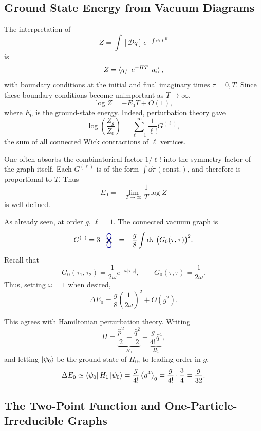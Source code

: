\subsection{Ground State Energy from Vacuum Diagrams}

The interpretation of
\[
  Z=\int [\mathcal Dq]\,e^{-\int\dd\tau\,L^E}
\]
is
\[
  Z=\bra{q_f}e^{-HT}\ket{q_i},
\]
with boundary conditions at the initial and final imaginary times
$\tau=0,T$. Since these boundary conditions become unimportant as
$T\to\infty$,
\[
  \log Z=-E_0T+O(1),
\]
where $E_0$ is the ground-state energy. Indeed, perturbation theory gave
\[
  \log\left(\frac{Z_g}{Z_0}\right)
  =
  \sum_{\ell=1}^{\infty}\frac{1}{\ell!}G^{(\ell)},
\]
the sum of all connected Wick contractions of $\ell$ vertices.

One often absorbs the combinatorical factor $1/\ell!$ into the symmetry
factor of the graph itself. Each $G^{(\ell)}$ is of the form
$\int\dd\tau\,(\text{const.})$, and therefore is proportional to $T$.
Thus
\[
  E_0=-\lim_{T\to\infty}\frac{1}{T}\log Z
\]
is well-defined.

As already seen, at order $g$, $\ell=1$. The connected vacuum graph is
\[
  G^{(1)}
  =
  3\,
  \begin{tikzpicture}[baseline=-0.5ex,scale=0.82]
    \draw[thick] (-0.15,-0.15) -- (0.15,0.15);
    \draw[thick] (-0.15,0.15) -- (0.15,-0.15);
    \fill (0,0) circle (1.2pt);
    \draw[thick,blue!60!black]
      (0,0) .. controls (-0.45,0.55) and (0.45,0.55) .. (0,0);
    \draw[thick,blue!60!black]
      (0,0) .. controls (-0.45,-0.55) and (0.45,-0.55) .. (0,0);
  \end{tikzpicture}
  =
  -\frac{g}{8}\int\dd\tau\,\bigl(G_0(\tau,\tau)\bigr)^2.
\]
Recall that
\[
  G_0(\tau_1,\tau_2)=\frac{1}{2\omega}e^{-\omega|\tau_{12}|},
  \qquad
  G_0(\tau,\tau)=\frac{1}{2\omega}.
\]
Thus, setting $\omega=1$ when desired,
\[
  \Delta E_0
  =
  \frac{g}{8}\left(\frac{1}{2\omega}\right)^2+O(g^2).
\]

This agrees with Hamiltonian perturbation theory. Writing
\[
  H=
  \underbrace{\frac{\hat p^2}{2}+\frac{\hat q^2}{2}}_{H_0}
  +
  \underbrace{\frac{g}{4!}\hat q^4}_{H_1},
\]
and letting $\ket{\psi_0}$ be the ground state of $H_0$, to leading order
in $g$,
\[
  \Delta E_0\simeq
  \bra{\psi_0}H_1\ket{\psi_0}
  =
  \frac{g}{4!}\left\langle q^4\right\rangle_0
  =
  \frac{g}{4!}\cdot\frac{3}{4}
  =
  \frac{g}{32}.
\]

\subsection{The Two-Point Function and One-Particle-Irreducible Graphs}

